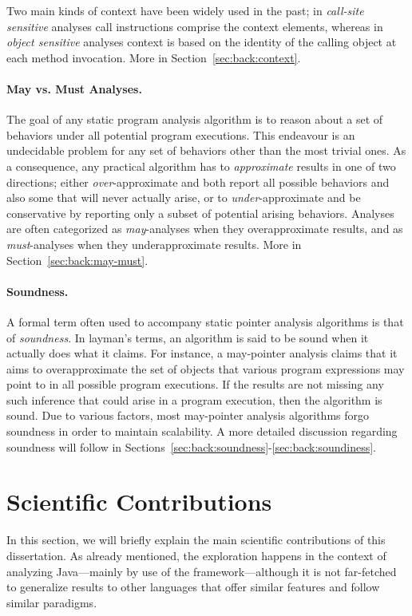 Two main kinds of context have been widely used in the past; in \emph{call-site sensitive} analyses call instructions comprise the context elements, whereas in \emph{object sensitive} analyses context is based on the identity of the calling object at each method invocation. More in Section~\ref{sec:back:context}.


\paragraph*{May vs. Must Analyses.}
The goal of any static program analysis algorithm is to reason about a set of behaviors under all potential program executions. This endeavour is an undecidable problem for any set of behaviors other than the most trivial ones. As a consequence, any practical algorithm has to \emph{approximate} results in one of two directions; either \emph{over}-approximate and both report all possible behaviors and also some that will never actually arise, or to \emph{under}-approximate and be conservative by reporting only a subset of potential arising behaviors. Analyses are often categorized as \emph{may}-analyses when they overapproximate results, and as \emph{must}-analyses when they underapproximate results. More in Section~\ref{sec:back:may-must}.


\paragraph*{Soundness.}
A formal term often used to accompany static pointer analysis algorithms is that of \emph{soundness}. In layman's terms, an algorithm is said to be sound when it actually does what it claims. For instance, a may-pointer analysis claims that it aims to overapproximate the set of objects that various program expressions may point to in all possible program executions. If the results are not missing any such inference that could arise in a program execution, then the algorithm is sound. Due to various factors, most may-pointer analysis algorithms forgo soundness in order to maintain scalability. A more detailed discussion regarding soundness will follow in Sections~\ref{sec:back:soundness}-\ref{sec:back:soundiness}.



\section{Scientific Contributions}

In this section, we will briefly explain the main scientific contributions of this dissertation. As already mentioned, the exploration happens in the context of analyzing Java---mainly by use of the \doop{} framework---although it is not far-fetched to generalize results to other languages that offer similar features and follow similar paradigms.

